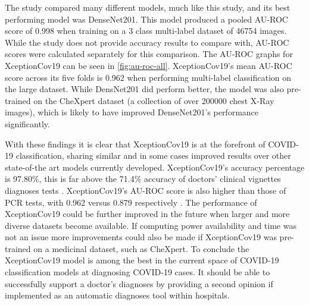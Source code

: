 The \cite{bressem2020comparing} study compared many different models, much like this study, and its best performing model was DenseNet201. This model produced a pooled AU-ROC score of 0.998 when training on a 3 class multi-label dataset of 46754 images. While the study does not provide accuracy results to compare with, AU-ROC scores were calculated separately for this comparison. The AU-ROC graphs for XceptionCov19 can be seen in \autoref{fig:au-roc-all}. XceptionCov19's mean AU-ROC score across its five folds is 0.962 when performing multi-label classification on the large dataset. While \cite{bressem2020comparing} DensNet201 did perform better, the model was also pre-trained on the CheXpert dataset (a collection of over 200000 chest X-Ray images), which is likely to have improved DenseNet201's performance significantly.

With these findings it is clear that XceptionCov19 is at the forefront of COVID-19 classification, sharing similar and in some cases improved results over other state-of-the art models currently developed. XceptionCov19's accuracy percentage is 97.80\%, this is far above the 71.4\% accuracy of doctors' clinical vignettes diagnoses tests \citep{richens2020improving}. XceptionCov19's AU-ROC score is also higher than those of PCR tests, with 0.962 versus 0.879 respectively \citep{mardani2020laboratory}. The performance of XceptionCov19 could be further improved in the future when larger and more diverse datasets become available. If computing power availability and time was not an issue more improvements could also be made if XceptionCov19 was pre-trained on a medicinal dataset, such as CheXpert. To conclude the XceptionCov19 model is among the best in the current space of COVID-19 classification models at diagnosing COVID-19 cases. It should be able to successfully support a doctor's diagnoses by providing a second opinion if implemented as an automatic diagnoses tool within hospitals.